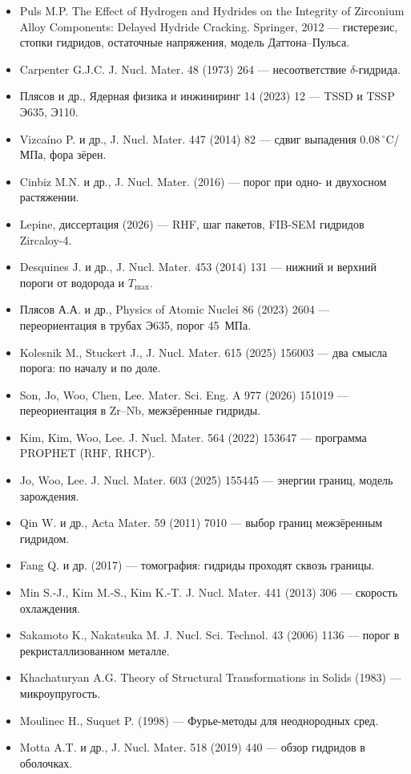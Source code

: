 \begin{itemize}\small
\item Puls M.P. The Effect of Hydrogen and Hydrides on the Integrity of Zirconium Alloy Components:
  Delayed Hydride Cracking. Springer, 2012 --- гистерезис, стопки гидридов, остаточные напряжения,
  модель Даттона--Пульса.
\item Carpenter G.J.C. J. Nucl. Mater. 48 (1973) 264 --- несоответствие $\delta$-гидрида.
\item Плясов и др., Ядерная физика и инжиниринг 14 (2023) 12 --- TSSD и TSSP Э635, Э110.
\item Vizcaíno P. и др., J. Nucl. Mater. 447 (2014) 82 --- сдвиг выпадения 0.08\,$^\circ$C/МПа, фора зёрен.
\item Cinbiz M.N. и др., J. Nucl. Mater. (2016) --- порог при одно- и двухосном растяжении.
\item Lepine, диссертация (2026) --- RHF, шаг пакетов, FIB-SEM гидридов Zircaloy-4.
\item Desquines J. и др., J. Nucl. Mater. 453 (2014) 131 --- нижний и верхний пороги от водорода и $T_{\max}$.
\item Плясов А.А. и др., Physics of Atomic Nuclei 86 (2023) 2604 --- переориентация в трубах Э635, порог 45~МПа.
\item Kolesnik M., Stuckert J., J. Nucl. Mater. 615 (2025) 156003 --- два смысла порога: по началу и по доле.
\item Son, Jo, Woo, Chen, Lee. Mater. Sci. Eng. A 977 (2026) 151019 --- переориентация в Zr--Nb, межзёренные гидриды.
\item Kim, Kim, Woo, Lee. J. Nucl. Mater. 564 (2022) 153647 --- программа PROPHET (RHF, RHCP).
\item Jo, Woo, Lee. J. Nucl. Mater. 603 (2025) 155445 --- энергии границ, модель зарождения.
\item Qin W. и др., Acta Mater. 59 (2011) 7010 --- выбор границ межзёренным гидридом.
\item Fang Q. и др. (2017) --- томография: гидриды проходят сквозь границы.
\item Min S.-J., Kim M.-S., Kim K.-T. J. Nucl. Mater. 441 (2013) 306 --- скорость охлаждения.
\item Sakamoto K., Nakatsuka M. J. Nucl. Sci. Technol. 43 (2006) 1136 --- порог в рекристаллизованном металле.
\item Khachaturyan A.G. Theory of Structural Transformations in Solids (1983) --- микроупругость.
\item Moulinec H., Suquet P. (1998) --- Фурье-методы для неоднородных сред.
\item Motta A.T. и др., J. Nucl. Mater. 518 (2019) 440 --- обзор гидридов в оболочках.
\end{itemize}
